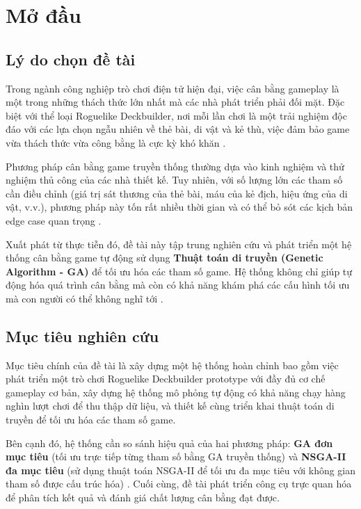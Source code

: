 \clearpage
{}
{}
\chapter*{Mở đầu}

\section{Lý do chọn đề tài}

Trong ngành công nghiệp trò chơi điện tử hiện đại, việc cân bằng gameplay là một trong những thách thức lớn nhất mà các nhà phát triển phải đối mặt. Đặc biệt với thể loại Roguelike Deckbuilder, nơi mỗi lần chơi là một trải nghiệm độc đáo với các lựa chọn ngẫu nhiên về thẻ bài, di vật và kẻ thù, việc đảm bảo game vừa thách thức vừa công bằng là cực kỳ khó khăn \cite{schell2019art}.

Phương pháp cân bằng game truyền thống thường dựa vào kinh nghiệm và thử nghiệm thủ công của các nhà thiết kế. Tuy nhiên, với số lượng lớn các tham số cần điều chỉnh (giá trị sát thương của thẻ bài, máu của kẻ địch, hiệu ứng của di vật, v.v.), phương pháp này tốn rất nhiều thời gian và có thể bỏ sót các kịch bản edge case quan trọng \cite{jaffe2012optimizing}.

Xuất phát từ thực tiễn đó, đề tài này tập trung nghiên cứu và phát triển một hệ thống cân bằng game tự động sử dụng \textbf{Thuật toán di truyền (Genetic Algorithm - GA)} để tối ưu hóa các tham số game. Hệ thống không chỉ giúp tự động hóa quá trình cân bằng mà còn có khả năng khám phá các cấu hình tối ưu mà con người có thể không nghĩ tới \cite{holland1992adaptation, yannakakis2018artificial}.

\section{Mục tiêu nghiên cứu}

Mục tiêu chính của đề tài là xây dựng một hệ thống hoàn chỉnh bao gồm việc phát triển một trò chơi Roguelike Deckbuilder prototype với đầy đủ cơ chế gameplay cơ bản, xây dựng hệ thống mô phỏng tự động có khả năng chạy hàng nghìn lượt chơi để thu thập dữ liệu, và thiết kế cùng triển khai thuật toán di truyền để tối ưu hóa các tham số game.

Bên cạnh đó, hệ thống cần so sánh hiệu quả của hai phương pháp: \textbf{GA đơn mục tiêu} (tối ưu trực tiếp từng tham số bằng GA truyền thống) và \textbf{NSGA-II đa mục tiêu} (sử dụng thuật toán NSGA-II để tối ưu đa mục tiêu với không gian tham số được cấu trúc hóa) \cite{deb2002fast, zitzler2000comparison}. Cuối cùng, đề tài phát triển công cụ trực quan hóa để phân tích kết quả và đánh giá chất lượng cân bằng đạt được.

